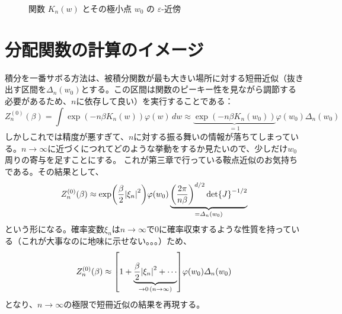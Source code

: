 \documentclass[dvipdfmx]{jsarticle}
\begin{document}
\begin{figure}[H]
\centering
{}
\caption{関数 $K_n(w)$ とその極小点 $w_0$ の $\varepsilon\text{-}$近傍}
\label{fig:spiky-kn}
\end{figure}

\section{分配関数の計算のイメージ}
積分を一番サボる方法は、被積分関数が最も大きい場所に対する短冊近似（抜き出す区間を$\varDelta_n(w_0)$とする。この区間は関数のピーキー性を見ながら調節する必要があるため、$n$に依存して良い）を実行することである：
\begin{equation}
    Z_n^{(0)}(\beta) = \int\exp(-n\beta K_n(w))\varphi(w)\,dw \approx \underbrace{\exp(-n\beta K_n(w_0))}_{=1}\varphi(w_0)\varDelta_n(w_0)
\end{equation}
しかしこれでは精度が悪すぎて、$n$に対する振る舞いの情報が落ちてしまっている。$n\to\infty$に近づくにつれてどのような挙動をするか見たいので、少しだけ$w_0$周りの寄与を足すことにする。
これが第三章で行っている鞍点近似のお気持ちである。その結果として、
\begin{equation}
    Z_n^{(0)}(\beta) \approx \exp(\frac{\beta}{2}\abs{\xi_n}^2)\varphi(w_0)\underbrace{\qty(\frac{2\pi}{n\beta})^{d/2}\det{J}^{-1/2}}_{=\varDelta_n(w_0)}
\end{equation}
という形になる。確率変数$\xi_n$は$n\to\infty$で$0$に確率収束するような性質を持っている（これが大事なのに地味に示せない。。。）ため、
\begin{equation}
    Z_n^{(0)}(\beta) \approx \qty[1+\underbrace{\frac{\beta}{2}\abs{\xi_n}^2+\cdots}_{\to 0\,(n\to\infty)}]\varphi(w_0)\varDelta_n(w_0)
\end{equation}
となり、$n\to\infty$の極限で短冊近似の結果を再現する。
\end{document}
